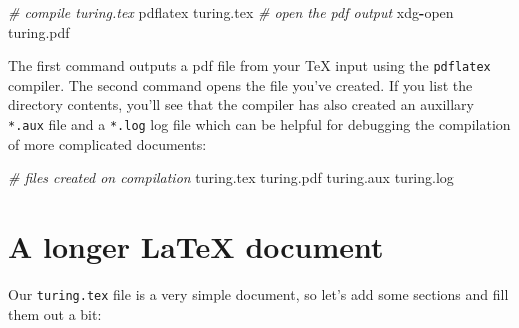 \documentclass[
]{book}
\newenvironment{Shaded}{\begin{snugshade}}{\end{snugshade}}
\newcommand{\CommentTok}[1]{\textcolor[rgb]{0.56,0.35,0.01}{\textit{#1}}}
\newcommand{\NormalTok}[1]{#1}
\newcommand{\OperatorTok}[1]{\textcolor[rgb]{0.81,0.36,0.00}{\textbf{#1}}}
\begin{document}
\begin{Shaded}
\begin{Highlighting}[]
\CommentTok{\# compile turing.tex}
\NormalTok{pdflatex turing.tex}
\CommentTok{\# open the pdf output}
\NormalTok{xdg}\OperatorTok{{-}}\NormalTok{open turing.pdf}
\end{Highlighting}
\end{Shaded}

The first command outputs a pdf file from your TeX input using the \texttt{pdflatex} compiler. The second command opens the file you've created. If you list the directory contents, you'll see that the compiler has also created an auxillary \texttt{*.aux} file and a \texttt{*.log} log file which can be helpful for debugging the compilation of more complicated documents:

\begin{Shaded}
\begin{Highlighting}[]
\CommentTok{\# files created on compilation}
\NormalTok{turing.tex}
\NormalTok{turing.pdf}
\NormalTok{turing.aux}
\NormalTok{turing.log}
\end{Highlighting}
\end{Shaded}

\hypertarget{longer}{%
\section{A longer LaTeX document}\label{longer}}

Our \texttt{turing.tex} file is a very simple document, so let's add some sections and fill them out a bit:
\end{document}
